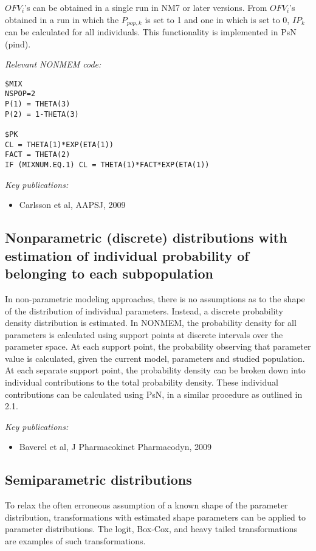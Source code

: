\documentclass[a4paper,11pt]{article}
\begin{document}
\vspace{10pt}

$OFV_i$'s can be obtained in a single run in NM7 or later
versions. From $OFV_i$'s obtained in a run in which the $P_{pop,k}$ is
set to 1 and one in which is set to 0, $IP_k$ can be calculated for all
individuals. This functionality is implemented in PsN (pind).

\noindent \emph{Relevant NONMEM code:}
\begin{lstlisting}
$MIX 
NSPOP=2
P(1) = THETA(3)
P(2) = 1-THETA(3)

$PK
CL = THETA(1)*EXP(ETA(1))
FACT = THETA(2)
IF (MIXNUM.EQ.1) CL = THETA(1)*FACT*EXP(ETA(1))
\end{lstlisting}

\noindent \emph{Key publications:}
\begin{itemize}
\item Carlsson et al, AAPSJ, 2009
\end{itemize}

\subsection{Nonparametric (discrete) distributions with estimation of
  individual probability of belonging to each subpopulation}

In non-parametric modeling approaches, there is no assumptions as to
the shape of the distribution of individual parameters. Instead, a
discrete probability density distribution is estimated. In NONMEM, the
probability density for all parameters is calculated using support
points at discrete intervals over the parameter space. At each support
point, the probability observing that parameter value is calculated,
given the current model, parameters and studied population. At each
separate support point, the probability density can be broken down
into individual contributions to the total probability density. These
individual contributions can be calculated using PsN, in a similar
procedure as outlined in 2.1.

\vspace{10pt}

\noindent \emph{Key publications:}
\begin{itemize}
\item Baverel et al, J Pharmacokinet Pharmacodyn, 2009
\end{itemize}

\subsection{Semiparametric distributions}
To relax the often erroneous assumption of a known shape of the
parameter distribution, transformations with estimated shape
parameters can be applied to parameter distributions. The logit,
Box-Cox, and heavy tailed transformations are examples of such
transformations.
\end{document}
